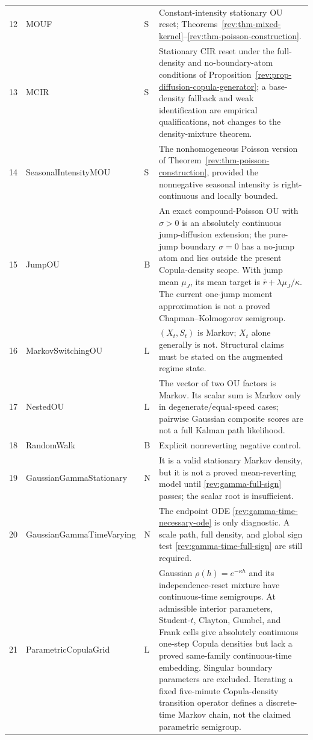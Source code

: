 \documentclass[11pt]{article}
\theoremstyle{remark}
\begin{document}
\begin{longtable}{p{}p{}p{}p{}}
12 & MOUF & S & Constant-intensity stationary OU reset; Theorems~\ref{rev:thm-mixed-kernel}--\ref{rev:thm-poisson-construction}.\\
13 & MCIR & S & Stationary CIR reset under the full-density and no-boundary-atom conditions of Proposition~\ref{rev:prop-diffusion-copula-generator}; a base-density fallback and weak identification are empirical qualifications, not changes to the density-mixture theorem.\\
14 & SeasonalIntensity\allowbreak{}MOU & S & The nonhomogeneous Poisson version of Theorem~\ref{rev:thm-poisson-construction}, provided the nonnegative seasonal intensity is right-continuous and locally bounded.\\
15 & JumpOU & B & An exact compound-Poisson OU with $\sigma>0$ is an absolutely continuous jump-diffusion extension; the pure-jump boundary $\sigma=0$ has a no-jump atom and lies outside the present Copula-density scope.  With jump mean $\mu_J$, its mean target is $\bar r+\lambda\mu_J/\kappa$.  The current one-jump moment approximation is not a proved Chapman--Kolmogorov semigroup.\\
16 & MarkovSwitching\allowbreak{}OU & L & $(X_t,S_t)$ is Markov; $X_t$ alone generally is not.  Structural claims must be stated on the augmented regime state.\\
17 & NestedOU & L & The vector of two OU factors is Markov.  Its scalar sum is Markov only in degenerate/equal-speed cases; pairwise Gaussian composite scores are not a full Kalman path likelihood.\\
18 & RandomWalk & B & Explicit nonreverting negative control.\\
19 & GaussianGamma\allowbreak{}Stationary & N & It is a valid stationary Markov density, but it is not a proved mean-reverting model until \eqref{rev:gamma-full-sign} passes; the scalar root is insufficient.\\
20 & GaussianGamma\allowbreak{}TimeVarying & N & The endpoint ODE \eqref{rev:gamma-time-necessary-ode} is only diagnostic.  A scale path, full density, and global sign test \eqref{rev:gamma-time-full-sign} are still required.\\
21 & ParametricCopula\allowbreak{}Grid & L & Gaussian $\rho(h)=e^{-\kappa h}$ and its independence-reset mixture have continuous-time semigroups.  At admissible interior parameters, Student-$t$, Clayton, Gumbel, and Frank cells give absolutely continuous one-step Copula densities but lack a proved same-family continuous-time embedding.  Singular boundary parameters are excluded.  Iterating a fixed five-minute Copula-density transition operator defines a discrete-time Markov chain, not the claimed parametric semigroup.\\

\end{longtable}
\end{document}
